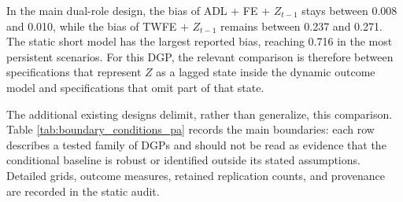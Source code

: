 \documentclass[
]{article}
\begin{document}
In the main dual-role design, the bias of ADL + FE + \(Z_{t-1}\) stays
between 0.008 and 0.010, while the bias of TWFE + \(Z_{t-1}\) remains
between 0.237 and 0.271. The static short model has the largest reported
bias, reaching 0.716 in the most persistent scenarios. For this DGP, the
relevant comparison is therefore between specifications that represent
\(Z\) as a lagged state inside the dynamic outcome model and
specifications that omit part of that state.

The additional existing designs delimit, rather than generalize, this
comparison. Table \ref{tab:boundary_conditions_pa} records the main
boundaries: each row describes a tested family of DGPs and should not be
read as evidence that the conditional baseline is robust or identified
outside its stated assumptions. Detailed grids, outcome measures,
retained replication counts, and provenance are recorded in the static
audit.
\end{document}
